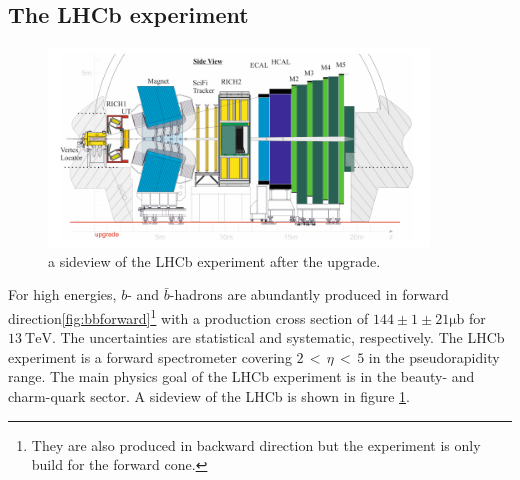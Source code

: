 \subsection{The LHCb experiment}
\label{sec:upgradeLHCb}

\begin{figure}
  \centering
  \includegraphics[width=0.9\textwidth]{plots/LHCb_facility.png}
  \caption{a sideview of the LHCb experiment\cite{facilityLHCb} after the upgrade.}
  \label{fig:LHCb}
\end{figure}

For high energies, $b$- and $\bar{b}$-hadrons are abundantly produced in forward
direction\ref{fig:bbforward}\footnote{They are also produced in backward direction but the experiment is only build for the forward cone.} with a production cross section of $144 \pm 1 \pm 21 \si{\micro\barn}$ \cite{bbXsection} for $\SI{13}{\tera\electronvolt}$.
The uncertainties are statistical and systematic, respectively.
The LHCb experiment\cite{lhcbInfo} is a forward spectrometer covering $2 \,<\, \eta \,<\, 5$ in the pseudorapidity range. The main physics goal of the LHCb experiment is in the beauty- and charm-quark sector. A sideview of the LHCb is shown in figure \ref{fig:LHCb}.

